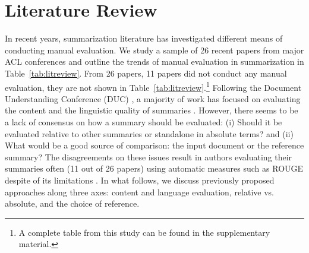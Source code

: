 \documentclass[11pt,a4paper]{article}
\begin{document}
\section{Literature Review}
\label{sec:review}

In recent years, summarization literature has investigated different means of conducting manual evaluation. We study a sample of 26 recent papers from major ACL conferences and outline the trends of manual evaluation in summarization in Table~\ref{tab:litreview}. From 26 papers, 11 papers \citep[e.g.,][]{See2017,Kedzie2018,Cao2018a} did not conduct any manual evaluation, they are not shown in Table~\ref{tab:litreview}.\footnote{A complete table from this study can be found in the supplementary material.}  Following the Document Understanding Conference (DUC) \citep{dang2005overview}, a majority of work has focused on evaluating the content and the linguistic quality of summaries \cite{Nenkova:2005:ATS}. However, there seems to be a lack of consensus on how a summary should be evaluated: (i) Should it be evaluated relative to other summaries or standalone in absolute terms? and (ii) What would be a good source of comparison: the input document or the reference summary? The disagreements on these issues result in authors evaluating their summaries often (11 out of 26 papers) using automatic measures such as ROUGE \cite{Lin2004} despite of its limitations \cite{schluter:2017:EACLshort}. 
In what follows, we discuss previously proposed %
approaches along three axes: content and language evaluation, relative vs. absolute, and the choice of reference.
\end{document}
